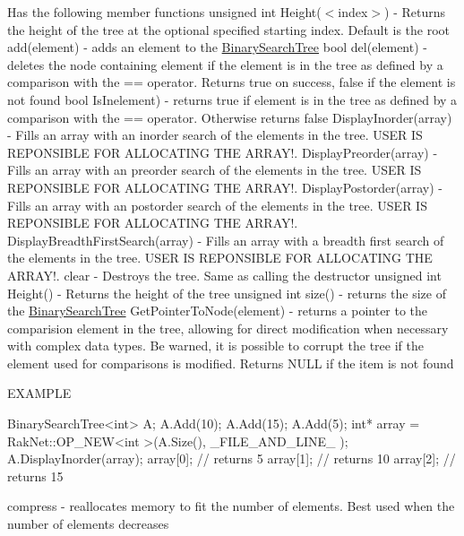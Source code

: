 Has the following member functions unsigned int Height($<$index$>$) -\/ Returns the height of the tree at the optional specified starting index. Default is the root add(element) -\/ adds an element to the \hyperlink{class_data_structures_1_1_binary_search_tree}{Binary\-Search\-Tree} bool del(element) -\/ deletes the node containing element if the element is in the tree as defined by a comparison with the == operator. Returns true on success, false if the element is not found bool Is\-Inelement) -\/ returns true if element is in the tree as defined by a comparison with the == operator. Otherwise returns false Display\-Inorder(array) -\/ Fills an array with an inorder search of the elements in the tree. U\-S\-E\-R I\-S R\-E\-P\-O\-N\-S\-I\-B\-L\-E F\-O\-R A\-L\-L\-O\-C\-A\-T\-I\-N\-G T\-H\-E A\-R\-R\-A\-Y!. Display\-Preorder(array) -\/ Fills an array with an preorder search of the elements in the tree. U\-S\-E\-R I\-S R\-E\-P\-O\-N\-S\-I\-B\-L\-E F\-O\-R A\-L\-L\-O\-C\-A\-T\-I\-N\-G T\-H\-E A\-R\-R\-A\-Y!. Display\-Postorder(array) -\/ Fills an array with an postorder search of the elements in the tree. U\-S\-E\-R I\-S R\-E\-P\-O\-N\-S\-I\-B\-L\-E F\-O\-R A\-L\-L\-O\-C\-A\-T\-I\-N\-G T\-H\-E A\-R\-R\-A\-Y!. Display\-Breadth\-First\-Search(array) -\/ Fills an array with a breadth first search of the elements in the tree. U\-S\-E\-R I\-S R\-E\-P\-O\-N\-S\-I\-B\-L\-E F\-O\-R A\-L\-L\-O\-C\-A\-T\-I\-N\-G T\-H\-E A\-R\-R\-A\-Y!. clear -\/ Destroys the tree. Same as calling the destructor unsigned int Height() -\/ Returns the height of the tree unsigned int size() -\/ returns the size of the \hyperlink{class_data_structures_1_1_binary_search_tree}{Binary\-Search\-Tree} Get\-Pointer\-To\-Node(element) -\/ returns a pointer to the comparision element in the tree, allowing for direct modification when necessary with complex data types. Be warned, it is possible to corrupt the tree if the element used for comparisons is modified. Returns N\-U\-L\-L if the item is not found

E\-X\-A\-M\-P\-L\-E 
\begin{DoxyCode}
BinarySearchTree<int> A;
A.Add(10);
A.Add(15);
A.Add(5);
\textcolor{keywordtype}{int}* array = RakNet::OP\_NEW<int >(A.Size(), \_FILE\_AND\_LINE\_ );
A.DisplayInorder(array);
array[0]; \textcolor{comment}{// returns 5}
array[1]; \textcolor{comment}{// returns 10}
array[2]; \textcolor{comment}{// returns 15}
\end{DoxyCode}
 compress -\/ reallocates memory to fit the number of elements. Best used when the number of elements decreases

